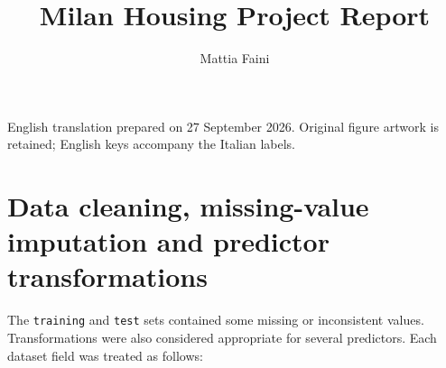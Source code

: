 \documentclass[a4paper,11pt]{article}
\title{Milan Housing Project Report}
\author{Mattia Faini}
\date{}
\begin{document}
\maketitle
\begin{center}
\small English translation prepared on 27 September 2026. Original figure artwork
is retained; English keys accompany the Italian labels.
\end{center}

\section{Data cleaning, missing-value imputation and predictor transformations}
The \texttt{training} and \texttt{test} sets contained some missing or inconsistent
values. Transformations were also considered appropriate for several predictors.
Each dataset field was treated as follows:
\end{document}
